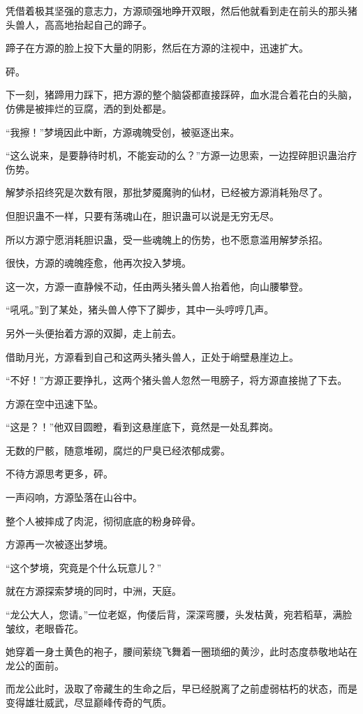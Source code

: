 \begin{this_body}
凭借着极其坚强的意志力，方源顽强地睁开双眼，然后他就看到走在前头的那头猪头兽人，高高地抬起自己的蹄子。

蹄子在方源的脸上投下大量的阴影，然后在方源的注视中，迅速扩大。

砰。

下一刻，猪蹄用力踩下，把方源的整个脑袋都直接踩碎，血水混合着花白的头脑，仿佛是被摔烂的豆腐，洒的到处都是。

“我擦！”梦境因此中断，方源魂魄受创，被驱逐出来。

“这么说来，是要静待时机，不能妄动的么？”方源一边思索，一边捏碎胆识蛊治疗伤势。

解梦杀招终究是次数有限，那批梦魇魔驹的仙材，已经被方源消耗殆尽了。

但胆识蛊不一样，只要有荡魂山在，胆识蛊可以说是无穷无尽。

所以方源宁愿消耗胆识蛊，受一些魂魄上的伤势，也不愿意滥用解梦杀招。

很快，方源的魂魄痊愈，他再次投入梦境。

这一次，方源一直静候不动，任由两头猪头兽人抬着他，向山腰攀登。

“吼吼。”到了某处，猪头兽人停下了脚步，其中一头哼哼几声。

另外一头便抬着方源的双脚，走上前去。

借助月光，方源看到自己和这两头猪头兽人，正处于峭壁悬崖边上。

“不好！”方源正要挣扎，这两个猪头兽人忽然一甩膀子，将方源直接抛了下去。

方源在空中迅速下坠。

“这是？！”他双目圆瞪，看到这悬崖底下，竟然是一处乱葬岗。

无数的尸骸，随意堆砌，腐烂的尸臭已经浓郁成雾。

不待方源思考更多，砰。

一声闷响，方源坠落在山谷中。

整个人被摔成了肉泥，彻彻底底的粉身碎骨。

方源再一次被逐出梦境。

“这个梦境，究竟是个什么玩意儿？”

就在方源探索梦境的同时，中洲，天庭。

“龙公大人，您请。”一位老妪，佝偻后背，深深弯腰，头发枯黄，宛若稻草，满脸皱纹，老眼昏花。

她穿着一身土黄色的袍子，腰间萦绕飞舞着一圈琐细的黄沙，此时态度恭敬地站在龙公的面前。

而龙公此时，汲取了帝藏生的生命之后，早已经脱离了之前虚弱枯朽的状态，而是变得雄壮威武，尽显巅峰传奇的气质。


\end{this_body}
